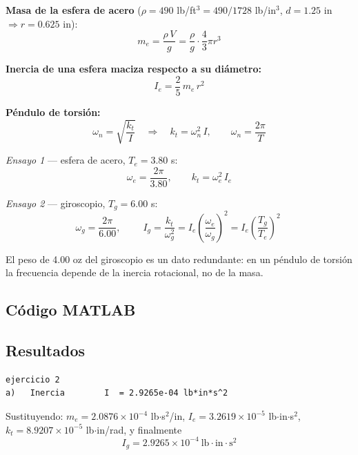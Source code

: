 \documentclass[12pt,letterpaper]{article}
\begin{document}
\textbf{Masa de la esfera de acero} ($\rho = 490$ lb/ft$^3 = 490/1728$ lb/in$^3$,
$d = 1.25$ in $\Rightarrow r = 0.625$ in):
\begin{equation}
m_e = \frac{\rho\,V}{g} = \frac{\rho}{g}\cdot\frac{4}{3}\pi r^{3}
\end{equation}

\textbf{Inercia de una esfera maciza respecto a su diámetro:}
\begin{equation}
I_e = \frac{2}{5}\,m_e\,r^{2}
\end{equation}

\textbf{Péndulo de torsión:}
\begin{equation}
\omega_n = \sqrt{\frac{k_t}{I}} \quad\Longrightarrow\quad k_t = \omega_n^{2}\,I,
\qquad \omega_n = \frac{2\pi}{T}
\end{equation}

\emph{Ensayo 1} --- esfera de acero, $T_e = 3.80$ s:
\begin{equation}
\omega_e = \frac{2\pi}{3.80}, \qquad k_t = \omega_e^{2}\,I_e
\end{equation}

\emph{Ensayo 2} --- giroscopio, $T_g = 6.00$ s:
\begin{equation}
\omega_g = \frac{2\pi}{6.00}, \qquad
\boxed{\;I_g = \frac{k_t}{\omega_g^{2}} = I_e\left(\frac{\omega_e}{\omega_g}\right)^{2}
= I_e\left(\frac{T_g}{T_e}\right)^{2}\;}
\end{equation}

\noindent El peso de 4.00 oz del giroscopio es un dato redundante: en un péndulo de
torsión la frecuencia depende de la inercia rotacional, no de la masa.

\subsection{Código MATLAB}


\subsection{Resultados}
\begin{lstlisting}[style=consola]
ejercicio 2
a)   Inercia        I  = 2.9265e-04 lb*in*s^2
\end{lstlisting}

\noindent Sustituyendo: $m_e = 2.0876\times10^{-4}$ lb$\cdot$s$^2$/in,
$I_e = 3.2619\times10^{-5}$ lb$\cdot$in$\cdot$s$^2$,
$k_t = 8.9207\times10^{-5}$ lb$\cdot$in/rad, y finalmente
\[
I_g = 2.9265\times10^{-4}\ \text{lb}\cdot\text{in}\cdot\text{s}^2
\]
\end{document}
